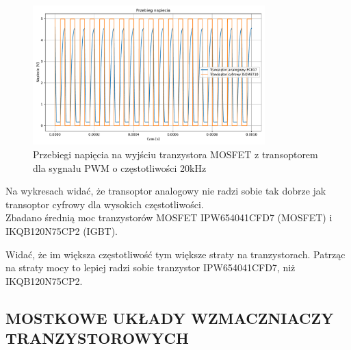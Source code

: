 \documentclass[11pt]{article}
\begin{document}
\begin{figure}[H]
\centering
\includegraphics[width=0.8\textwidth]{aun1_gate_circuit_digital_vs_analog_20khz.pdf}
\caption{Przebiegi napięcia na wyjściu tranzystora MOSFET z transoptorem dla sygnału PWM o częstotliwości 20kHz}
\end{figure}

Na wykresach widać, że transoptor analogowy nie radzi sobie tak dobrze jak transoptor cyfrowy dla wysokich częstotliwości.\\

Zbadano średnią moc tranzystorów MOSFET IPW654041CFD7 (MOSFET) i IKQB120N75CP2 (IGBT). \\

\begin{table}[H]
\centering
{}
\caption{Średnia moc wytrącaną na tranzystorze w zależności od częstotliwości}
\end{table}

Widać, że im większa częstotliwość tym większe straty na tranzystorach. Patrząc na straty mocy to lepiej radzi sobie tranzystor IPW654041CFD7, niż IKQB120N75CP2.\\

\subsection{MOSTKOWE UKŁADY WZMACZNIACZY TRANZYSTOROWYCH}
\end{document}
